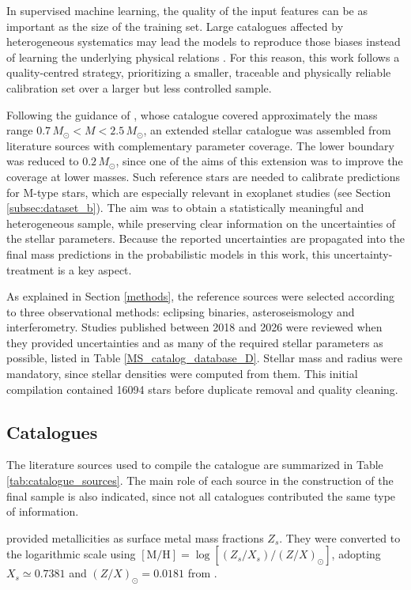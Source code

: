 In supervised machine learning, the quality of the input features can be as important as the size of the training set. Large catalogues affected by heterogeneous systematics may lead the models to reproduce those biases instead of learning the underlying physical relations \citep{li2021dataquality}. For this reason, this work follows a quality-centred strategy, prioritizing a smaller, traceable and physically reliable calibration set over a larger but less controlled sample.

Following the guidance of \citet{moya2018}, whose catalogue covered approximately the mass range $0.7\,M_\odot < M < 2.5\,M_\odot$, an extended stellar catalogue was assembled from literature sources with complementary parameter coverage. The lower boundary was reduced to $0.2\,M_\odot$, since one of the aims of this extension was to improve the coverage at lower masses. Such reference stars are needed to calibrate predictions for M-type stars, which are especially relevant in exoplanet studies (see Section \ref{subsec:dataset_b}). The aim was to obtain a statistically meaningful and heterogeneous sample, while preserving clear information on the uncertainties of the stellar parameters. Because the reported uncertainties are propagated into the final mass predictions in the probabilistic models in this work, this uncertainty-treatment is a key aspect.

As explained in Section \ref{methods}, the reference sources were selected according to three observational methods: eclipsing binaries, asteroseismology and interferometry. Studies published between 2018 and 2026 were reviewed when they provided uncertainties and as many of the required stellar parameters as possible, listed in Table \ref{MS_catalog_database_D}. Stellar mass and radius were mandatory, since stellar densities were computed from them. This initial compilation contained 16094 stars before duplicate removal and quality cleaning.

\subsection{Catalogues}
The literature sources used to compile the catalogue are summarized in Table \ref{tab:catalogue_sources}. The main role of each source in the construction of the final sample is also indicated, since not all catalogues contributed the same type of information.

\citet{Yildiz2019} provided metallicities as surface metal mass fractions $Z_s$. They were converted to the logarithmic scale using $[\mathrm{M}/\mathrm{H}] = \log \left[(Z_s/X_s)/(Z/X)_\odot\right]$, adopting $X_s \simeq 0.7381$ and $(Z/X)_\odot = 0.0181$ from \citet{asplund2009}.

